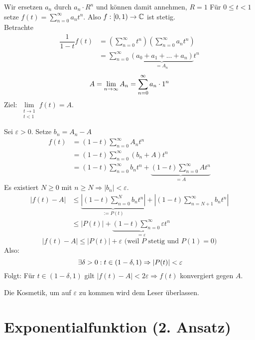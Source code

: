 \documentclass[main.tex]{subfiles}
\begin{document}
\begin{Beweis}
  Wir ersetzen $a_n$ durch $a_n \cdot R^n$ und können damit annehmen, $R = 1$
  Für $0 \leq t < 1$ setze $f(t) = \sum \limits_{n=0}^\infty a_n t^n$. Also $f:[0,1) \to \mathbb{C}$ ist stetig.\\
  Betrachte
  $$\begin{aligned}
    \dfrac{1}{1-t}f(t) &= \left(\sum \limits_{n=0}^\infty t^n\right)\left(\sum \limits_{n=0}^\infty a_n t^n\right) \\
    &= \sum \limits_{n=0}^\infty \underbrace{(a_0 + a_1 + ... + a_n)}_{ = A_n} t^n
  \end{aligned}$$
  $$A = \lim \limits_{n \to \infty} A_n = \sum \limits_{n=0}^\infty a_n \cdot 1^n$$
  Ziel: $\lim \limits_{\substack{t \to 1 \\ t < 1}} f(t) = A$.

  Sei $\varepsilon > 0$. Setze $b_n = A_n - A$
  $$\begin{aligned}
    f(t) &= (1-t) \sum \limits_{n=0}^\infty A_n t^n\\
    &= (1-t) \sum \limits_{n=0}^\infty (b_n + A) t^n\\
    &= (1-t) \sum \limits_{n=0}^\infty b_n t^n + \underbrace{(1-t) \sum \limits_{n=0}^\infty A t^n}_{= A}
  \end{aligned}$$
  Es existiert $N \geq 0$ mit $n \geq N \Rightarrow |b_n| < \varepsilon$.
  $$\begin{aligned}
    |f(t)-A| & \leq \underbrace{\left|(1-t) \sum \limits_{n=0}^N b_n t^n\right|}_{:= P(t)} + \left|(1-t) \sum \limits_{n=N+1}^\infty b_n t^n\right|\\
    & \leq |P(t)| + \underbrace{(1-t) \sum \limits_{n=0}^\infty \varepsilon t^n}_{ = \varepsilon}
  \end{aligned}$$
  $$|f(t)-A| \leq |P(t)| + \varepsilon \text{ (weil $P$ stetig und $P(1) = 0$)}$$
  Also:
  $$\;\exists \delta > 0 : t \in (1-\delta, 1) \Rightarrow |P(t)| < \varepsilon$$
  Folgt: Für $t \in (1-\delta, 1)$ gilt $|f(t)-A| < 2 \varepsilon \Rightarrow f(t)$ konvergiert gegen $A$.
  \begin{Bemerkung}
    Die Kosmetik, um auf $\varepsilon$ zu kommen wird dem Leser überlassen.
  \end{Bemerkung}
\end{Beweis}


\section{Exponentialfunktion (2. Ansatz)}
\end{document}
